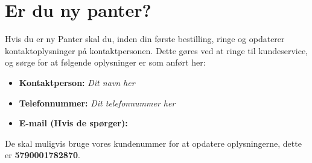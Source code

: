 \section{Er du ny panter?}
\label{sec:Er du ny Panter?}

Hvis du er ny Panter skal du, inden din første bestilling, ringe og opdaterer kontaktoplysninger på kontaktpersonen.
Dette gøres ved at ringe til \DRS kundeservice, og sørge for at følgende oplysninger er som anført her:

\begin{itemize}
	\item \textbf{Kontaktperson:} \textit{Dit navn her}
	\item \textbf{Telefonnummer:} \textit{Dit telefonnummer her}
	\item \textbf{E-mail (Hvis de spørger):} \bestmail
\end{itemize}

De skal muligvis bruge vores kundenummer for at opdatere oplysningerne, dette er \textbf{5790001782870}.




